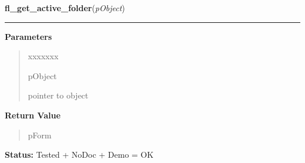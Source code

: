 \hspace{.8\funcindent}\begin{boxedminipage}{\funcwidth}

    \raggedright \textbf{fl\_get\_active\_folder}(\textit{pObject})

    \vspace{-1.5ex}

    \rule{\textwidth}{0.5\fboxrule}
\setlength{\parskip}{2ex}
\setlength{\parskip}{1ex}
      \textbf{Parameters}
      \vspace{-1ex}

      \begin{quote}
        \begin{Ventry}{xxxxxxx}

          \item[pObject]

          pointer to object

        \end{Ventry}

      \end{quote}

      \textbf{Return Value}
    \vspace{-1ex}

      \begin{quote}
      pForm

      \end{quote}

\textbf{Status:} Tested + NoDoc + Demo = OK



    \end{boxedminipage}

    \label{xformslib:library:fl_get_active_folder_number}

    \vspace{0.5ex}

